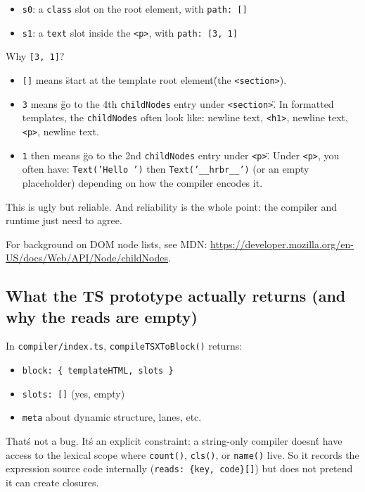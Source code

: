 \begin{itemize}
\item \texttt{s0}: a \texttt{class} slot on the root element, with \texttt{path: []}
\item \texttt{s1}: a \texttt{text} slot inside the \texttt{<p>}, with \texttt{path: [3, 1]}
\end{itemize}

Why \texttt{[3, 1]}?

\begin{itemize}
\item \texttt{[]} means \"start at the template root element\" (the \texttt{<section>}).
\item \texttt{3} means \"go to the 4th \texttt{childNodes} entry under \texttt{<section>}\".
	In formatted templates, the \texttt{childNodes} often look like: newline text, \texttt{<h1>}, newline text, \texttt{<p>}, newline text.
\item \texttt{1} then means \"go to the 2nd \texttt{childNodes} entry under \texttt{<p>}\".
		Under \texttt{<p>}, you often have: \texttt{Text('Hello ')} then \texttt{Text('\_\_hrbr\_\_')} (or an empty placeholder) depending on how the compiler encodes it.
\end{itemize}

This is ugly but reliable.
And reliability is the whole point: the compiler and runtime just need to agree.

For background on DOM node lists, see MDN:
\href{https://developer.mozilla.org/en-US/docs/Web/API/Node/childNodes}{https://developer.mozilla.org/en-US/docs/Web/API/Node/childNodes}.

\subsection{What the TS prototype actually returns (and why the reads are empty)}

In \texttt{compiler/index.ts}, \texttt{compileTSXToBlock()} returns:

\begin{itemize}
\item \texttt{block: \{ templateHTML, slots \}}
\item \texttt{slots: []} (yes, empty)
\item \texttt{meta} about dynamic structure, lanes, etc.
\end{itemize}

That\'s not a bug.
It\'s an explicit constraint: a string-only compiler doesn\'t have access to the lexical scope where \texttt{count()}, \texttt{cls()}, or \texttt{name()} live.
So it records the expression source code internally (\texttt{reads: \{key, code\}[]}) but does not pretend it can create closures.

